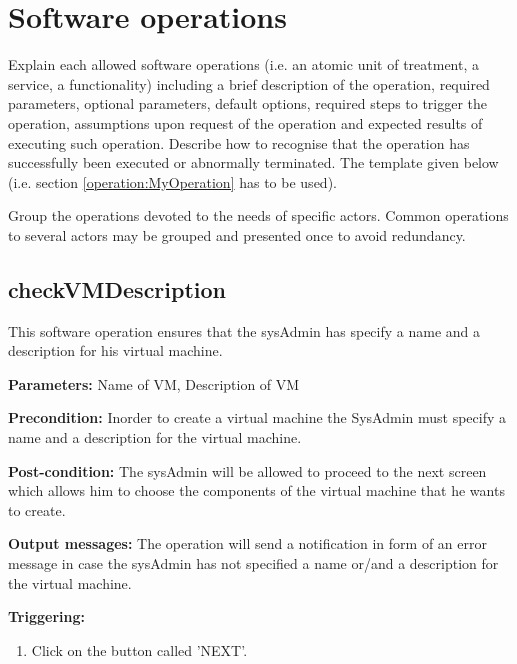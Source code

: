 \chapter{Software operations}
\label{chap:soptware_operations}


Explain each allowed software operations (i.e. an atomic unit of treatment, a service, a functionality) including a brief description of the operation, required parameters, optional parameters, default options, required steps to trigger the operation, assumptions upon request of the operation and expected results of executing such operation.
Describe how to recognise that the operation has successfully been executed or
abnormally terminated. The template given below (i.e. section \ref{operation:MyOperation} has to be used).

Group the operations devoted to the needs of specific actors. Common
operations to several actors may be grouped and presented once to avoid redundancy.


\section{checkVMDescription}
\label{operation:checkVMDescription}
This software operation ensures that the sysAdmin has specify a name and a
description for his virtual machine.
\begin{description}

\item \textbf{Parameters:} Name of VM, Description of VM
\item \textbf{Precondition:} Inorder to create a virtual machine the SysAdmin must
specify a name and a description for the virtual machine.
\item \textbf{Post-condition:} The sysAdmin will be allowed to proceed to the
next screen which allows him to choose the components of the virtual machine
that he wants to create.
\item \textbf{Output messages:} The operation will send a notification in form
of an error message in case the sysAdmin has not specified a name or/and a
description for the virtual machine.

\item \textbf{Triggering:}
\begin{enumerate}
\item Click on the button called 'NEXT'.
\end{enumerate}

 
\end{description}


